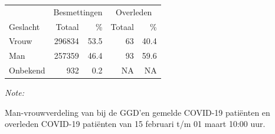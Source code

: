 \documentclass[
  english,
  man,floatsintext]{apa6}
\begin{document}
\newpage

\begin{table}
\centering\begingroup\fontsize{11}{13}\selectfont

\begin{threeparttable}
\begin{tabular}{lrrrr}
\toprule
\multicolumn{1}{c}{ } & \multicolumn{2}{c}{Besmettingen} & \multicolumn{2}{c}{Overleden} \\
\cmidrule(l{3pt}r{3pt}){2-3} \cmidrule(l{3pt}r{3pt}){4-5}
Geslacht & Totaal & \% & Totaal & \%\\
\midrule
Vrouw & 296834 & 53.5 & 63 & 40.4\\
Man & 257359 & 46.4 & 93 & 59.6\\
Onbekend & 932 & 0.2 & NA & NA\\
\bottomrule
\end{tabular}
\begin{tablenotes}
\item \textit{Note: } 
\item Man-vrouwverdeling van bij de GGD’en gemelde COVID-19 patiënten en overleden COVID-19 patiënten van 15 februari t/m 01 maart 10:00 uur.
\end{tablenotes}
\end{threeparttable}
\endgroup{}
\end{table}
\newpage
\end{document}
